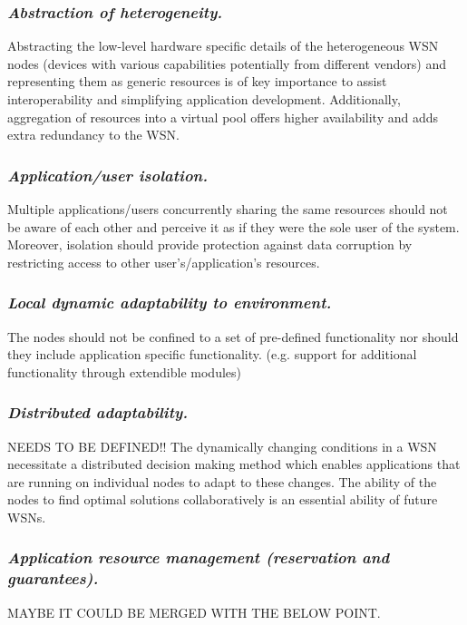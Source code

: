 	\subsubsection{ \textbf{\emph{Abstraction of heterogeneity.}}} Abstracting the low-level hardware specific details of the heterogeneous WSN nodes (devices with various capabilities potentially from different vendors) and representing them as generic resources is of key importance to assist interoperability and simplifying application development. Additionally, aggregation of resources into a virtual pool offers higher availability and adds extra redundancy to the WSN. 
	
	\subsubsection{\textbf{\emph{Application/user isolation.}}} Multiple applications/users concurrently sharing the same resources should not be aware of each other and perceive it as if they were the sole user of the system. Moreover, isolation should provide protection against data corruption by restricting access to other user's/application's resources.
	
	\subsubsection{ \textbf{\emph{Local dynamic adaptability to environment.}}} The nodes should not be confined to a set of pre-defined functionality nor should they include application specific functionality. (e.g. support for additional functionality through extendible modules)
	
	\subsubsection{ \textbf{\emph{Distributed adaptability.}}} {\color{red} NEEDS TO BE DEFINED!!} The dynamically changing conditions in a WSN necessitate a distributed decision making method which enables applications that are running on individual nodes to adapt to these changes. The ability of the nodes to find optimal solutions collaboratively is an essential ability of future WSNs.
	
	\subsubsection{ \textbf{\emph{Application resource management (reservation and guarantees).}}} {\color{red}MAYBE IT COULD BE MERGED WITH THE BELOW POINT.}
	
